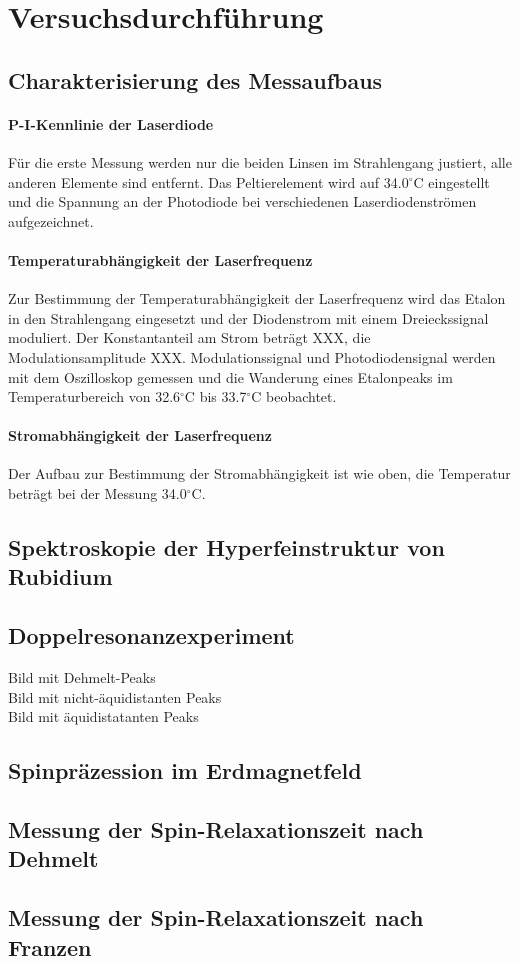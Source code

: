 \section{Versuchsdurchführung}


\subsection{Charakterisierung des Messaufbaus}

\paragraph{P-I-Kennlinie der Laserdiode}
Für die erste Messung werden nur die beiden Linsen im Strahlengang justiert, alle anderen Elemente sind entfernt. 
Das Peltierelement wird auf 34.0$^\circ$C eingestellt und die Spannung an der
Photodiode bei verschiedenen Laserdiodenströmen aufgezeichnet.

\paragraph{Temperaturabhängigkeit der Laserfrequenz}
Zur Bestimmung der Temperaturabhängigkeit der
Laserfrequenz wird das Etalon in den Strahlengang eingesetzt und der Diodenstrom mit einem Dreieckssignal
moduliert. Der Konstantanteil am Strom beträgt XXX, die Modulationsamplitude XXX.
Modulationssignal und Photodiodensignal werden mit dem Oszilloskop gemessen und die Wanderung eines Etalonpeaks
im Temperaturbereich von 32.6$^\circ$C bis 33.7$^\circ$C beobachtet.

\paragraph{Stromabhängigkeit der Laserfrequenz} Der Aufbau zur Bestimmung der Stromabhängigkeit ist wie oben,
die Temperatur beträgt bei der Messung 34.0$^\circ$C.


\subsection{Spektroskopie der Hyperfeinstruktur von Rubidium}


\subsection{Doppelresonanzexperiment}
Bild mit Dehmelt-Peaks \\
Bild mit nicht-äquidistanten Peaks \\
Bild mit äquidistatanten Peaks

\subsection{Spinpräzession im Erdmagnetfeld}


\subsection{Messung der Spin-Relaxationszeit nach Dehmelt}


\subsection{Messung der Spin-Relaxationszeit nach Franzen}